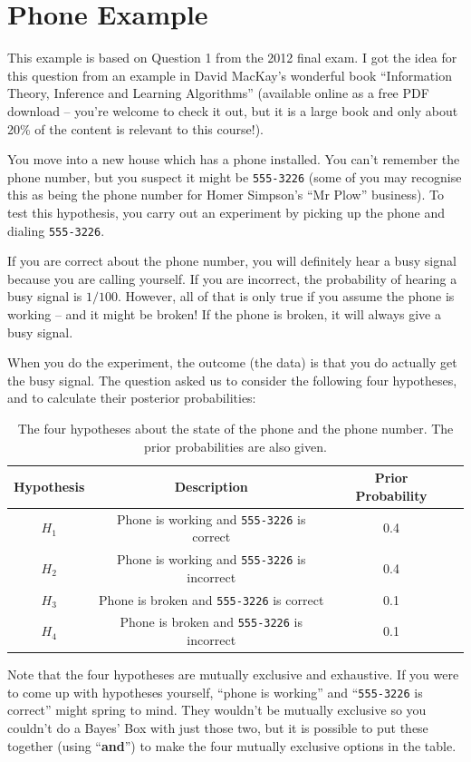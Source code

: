 \section{Phone Example}
This example is based on Question 1 from the 2012 final exam. I got the
idea for this question from an example in David MacKay's wonderful book
``Information Theory, Inference and Learning Algorithms''
(available online as a free PDF download -- you're welcome to check it out, but
it is a large book and only about 20\% of the content is relevant to this course!).

You move into a new house which has a phone
installed. You can't remember the phone number, but you suspect it
might be {\tt 555-3226} (some of you may recognise
this as being the phone number for Homer Simpson's ``Mr Plow'' business).
To test this hypothesis, you carry out an experiment
by picking up the phone and dialing {\tt 555-3226}.

If you are correct about
the phone number, you will definitely hear a busy signal because you are calling
yourself.
If you are incorrect, the probability of hearing a busy signal is $1/100$.
However, all of that is only true if you assume the phone is working -- and it
might be broken! If the phone is broken, it will always give a busy signal.

When you do the experiment, the outcome (the data) is that you do actually get the busy signal.
The question asked us to consider the following four hypotheses, and to calculate
their posterior probabilities:
\begin{table}[h!]
\begin{center}
\begin{tabular}{|c|c|c|c|}
\hline
Hypothesis & Description & Prior Probability\\
\hline
$H_1$ & Phone is working and {\tt 555-3226} is correct & 0.4\\
$H_2$ & Phone is working and {\tt 555-3226} is incorrect & 0.4\\
$H_3$ & Phone is broken and {\tt 555-3226} is correct & 0.1\\
$H_4$ & Phone is broken and {\tt 555-3226} is incorrect & 0.1\\
\hline
\end{tabular}
\caption{The four hypotheses about the state of the phone and the phone
number. The prior probabilities are also given.
\label{tab:phone}}
\end{center}
\end{table}
Note that the four hypotheses are mutually exclusive and exhaustive. If you were
to come up with hypotheses yourself, ``phone is working'' and ``{\tt 555-3226} is correct''
might spring to mind. They wouldn't be mutually exclusive so you couldn't do a
Bayes' Box with just those two, but it is possible to put these together (using
``{\bf and}'') to make the four mutually exclusive options in the table.

